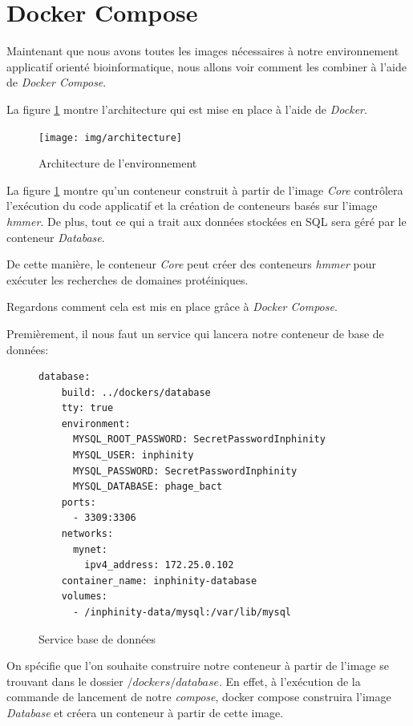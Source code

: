 \section{Docker Compose}
Maintenant que nous avons toutes les images nécessaires à notre environnement applicatif orienté bioinformatique, nous allons voir comment les combiner à l'aide de \emph{Docker Compose}.

La figure \ref{fig:architecture} montre l'architecture qui est mise en place à l'aide de \emph{Docker}.

\begin{figure}[H] 
\centering 
\texttt{[image: img/architecture]} 
\caption[architecture]{Architecture de l'environnement}
\label{fig:architecture} 
\end{figure}

La figure \ref{fig:architecture} montre qu'un conteneur construit à partir de l'image \emph{Core} contrôlera l'exécution du code applicatif et la création de conteneurs basés sur l'image \emph{hmmer}. De plus, tout ce qui a trait aux données stockées en SQL sera géré par le conteneur \emph{Database}.

De cette manière, le conteneur \emph{Core} peut créer des conteneurs \emph{hmmer} pour exécuter les recherches de domaines protéiniques.

Regardons comment cela est mis en place grâce à \emph{Docker Compose}. 

Premièrement, il nous faut un service qui lancera notre conteneur de base de données:

\begin{figure}[H] 
\centering 
\begin{lstlisting}[frame=single]
database:
    build: ../dockers/database
    tty: true
    environment:
      MYSQL_ROOT_PASSWORD: SecretPasswordInphinity
      MYSQL_USER: inphinity
      MYSQL_PASSWORD: SecretPasswordInphinity
      MYSQL_DATABASE: phage_bact
    ports:
      - 3309:3306
    networks:
      mynet:
        ipv4_address: 172.25.0.102
    container_name: inphinity-database
    volumes:
      - /inphinity-data/mysql:/var/lib/mysql
\end{lstlisting}
\caption[Service base de données]{Service base de données}
\label{fig:serviceDb} 
\end{figure}

On spécifie que l'on souhaite construire notre conteneur à partir de l'image se trouvant dans le dossier \emph{$/dockers/database$}. En effet, à l'exécution de la commande de lancement de notre \emph{compose}, docker compose construira l'image \emph{Database} et créera un conteneur à partir de cette image.

